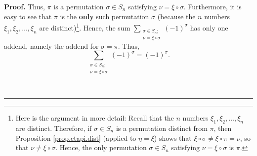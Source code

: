 \documentclass
[numbers=enddot,12pt,final,onecolumn,notitlepage,english]{scrartcl}%
\theoremstyle{definition}
\newenvironment{proof}[1][Proof]{\noindent\textbf{#1.} }{\ \rule{0.5em}{0.5em}}
\let\sumnonlimits\sum
\renewcommand{\sum}{\sumnonlimits\limits}
\newenvironment{vershort}{}{}
\begin{document}
\begin{proof}
\begin{vershort}
Thus, $\pi$ is a permutation $\sigma\in S_{n}$ satisfying $\nu=\xi\circ\sigma
$. Furthermore, it is easy to see that $\pi$ is the \textbf{only} such
permutation $\sigma$ (because the $n$ numbers $\xi_{1},\xi_{2},\ldots,\xi_{n}$
are distinct)\footnote{Here is the argument in more detail: Recall that the
$n$ numbers $\xi_{1},\xi_{2},\ldots,\xi_{n}$ are distinct. Therefore, if
$\sigma\in S_{n}$ is a permutation distinct from $\pi$, then Proposition
\ref{prop.etapi.dist} (applied to $\eta=\xi$) shows that $\xi\circ\sigma
\neq\xi\circ\pi=\nu$, so that $\nu\neq\xi\circ\sigma$. Hence, the only
permutation $\sigma\in S_{n}$ satisfying $\nu=\xi\circ\sigma$ is $\pi$.}.
Hence, the sum $\sum_{\substack{\sigma\in S_{n};\\\nu=\xi\circ\sigma}}\left(
-1\right)  ^{\sigma}$ has only one addend, namely the addend for $\sigma=\pi$.
Thus,
\begin{equation}
\sum_{\substack{\sigma\in S_{n};\\\nu=\xi\circ\sigma}}\left(  -1\right)
^{\sigma}=\left(  -1\right)  ^{\pi}. \label{pf.lem.xi-det.c3.short.sum=}%
\end{equation}

\end{vershort}


\end{proof}
\end{document}
